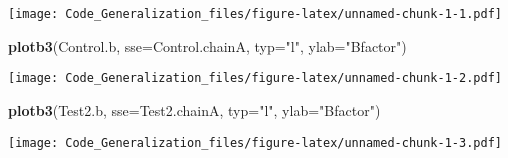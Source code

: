 \documentclass[]{article}
\newenvironment{Shaded}{\begin{snugshade}}{\end{snugshade}}
\newcommand{\KeywordTok}[1]{\textcolor[rgb]{0.13,0.29,0.53}{\textbf{#1}}}
\newcommand{\DataTypeTok}[1]{\textcolor[rgb]{0.13,0.29,0.53}{#1}}
\newcommand{\StringTok}[1]{\textcolor[rgb]{0.31,0.60,0.02}{#1}}
\newcommand{\OperatorTok}[1]{\textcolor[rgb]{0.81,0.36,0.00}{\textbf{#1}}}
\newcommand{\NormalTok}[1]{#1}
\begin{document}
\begin{Shaded}
\end{Shaded}

\texttt{[image: Code\_Generalization\_files/figure-latex/unnamed-chunk-1-1.pdf]}

\begin{Shaded}
\begin{Highlighting}[]
\KeywordTok{plotb3}\NormalTok{(Control.b, }\DataTypeTok{sse=}\NormalTok{Control.chainA, }\DataTypeTok{typ=}\StringTok{"l"}\NormalTok{, }\DataTypeTok{ylab=}\StringTok{"Bfactor"}\NormalTok{)}
\end{Highlighting}
\end{Shaded}

\texttt{[image: Code\_Generalization\_files/figure-latex/unnamed-chunk-1-2.pdf]}

\begin{Shaded}
\begin{Highlighting}[]
\KeywordTok{plotb3}\NormalTok{(Test2.b, }\DataTypeTok{sse=}\NormalTok{Test2.chainA, }\DataTypeTok{typ=}\StringTok{"l"}\NormalTok{, }\DataTypeTok{ylab=}\StringTok{"Bfactor"}\NormalTok{)}
\end{Highlighting}
\end{Shaded}

\texttt{[image: Code\_Generalization\_files/figure-latex/unnamed-chunk-1-3.pdf]}
\end{document}
